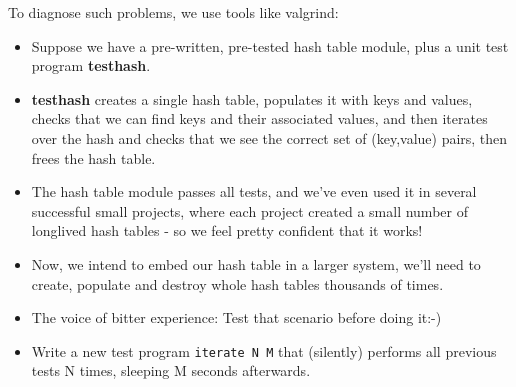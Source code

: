 \documentclass[aspectratio=169]{beamer}
\newcommand{\pitem}{\pause \item}
\begin{document}
\begin{frame}[fragile]
    To diagnose such problems, we use tools like \alert{valgrind}:
    \begin{itemize}
    \item
      Suppose we have a \alert{pre-written, pre-tested}
      hash table module, plus a unit test program {\bf testhash}.
    \pitem
      {\bf testhash} creates a single hash table, populates it with keys and values,
      checks that we can find keys and their associated values, and
      then iterates over the hash and checks that we see the correct
      set of (key,value) pairs, then frees the hash table.
    \pitem
      The hash table module \alert{passes all tests}, and
      we've even used it in several successful small projects,
      where each project created a small number of \alert{longlived} hash tables
      - so we feel pretty confident that it works!
    \pitem
      Now, we intend to embed our hash table in a larger system,
      we'll need to create, populate and destroy whole hash tables
      \alert{thousands of times}.
    \pitem
      The voice of bitter experience: \alert{Test that scenario} before doing it:-)
    \pause
    \item
      Write a new test program \verb+iterate N M+ that (silently)
      performs all previous tests N times, sleeping M seconds afterwards.
    \end{itemize}
\end{frame}
\end{document}
